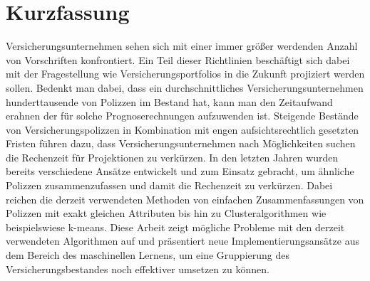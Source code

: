 

\chapter*{Kurzfassung}
\label{cha:kurzfassung}


Versicherungsunternehmen sehen sich mit einer immer größer werdenden Anzahl von Vorschriften konfrontiert. Ein Teil dieser Richtlinien beschäftigt sich dabei mit der Fragestellung wie Versicherungsportfolios in die Zukunft projiziert werden sollen. Bedenkt man dabei, dass ein durchschnittliches Versicherungsunternehmen hunderttausende von Polizzen im Bestand hat, kann man den Zeitaufwand erahnen der für solche Prognoserechnungen aufzuwenden ist. Steigende Bestände von Versicherungspolizzen in Kombination mit engen aufsichtsrechtlich gesetzten Fristen führen dazu, dass Versicherungsunternehmen nach Möglichkeiten suchen die Rechenzeit für Projektionen zu verkürzen. In den letzten Jahren wurden bereits verschiedene Ansätze entwickelt und zum Einsatz gebracht, um ähnliche Polizzen zusammenzufassen und damit die Rechenzeit zu verkürzen. Dabei reichen die derzeit verwendeten Methoden von einfachen Zusammenfassungen von Polizzen mit exakt gleichen Attributen bis hin zu Clusteralgorithmen wie beispielswiese k-means. Diese Arbeit zeigt mögliche Probleme mit den derzeit verwendeten Algorithmen auf und präsentiert neue Implementierungsansätze aus dem Bereich des maschinellen Lernens, um eine Gruppierung des Versicherungsbestandes noch effektiver umsetzen zu können.
